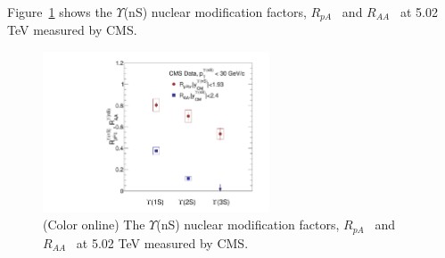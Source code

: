 Figure~\ref{fig:LHCpBPbPb} shows the $\Upsilon$(nS) nuclear modification factors,
    $R_{pA}$~\cite{CMS:2022wfi} and $R_{AA}$~\cite{CMS:2018zza}
    at 5.02 TeV measured by CMS.

\begin{figure}
\centering
  \includegraphics[width=0.60\textwidth]{Figures/ExpOverview/Fig_LHC_YnSRPPbRAAInt.pdf}
  \caption{(Color online) The $\Upsilon$(nS) nuclear modification factors,
    $R_{pA}$~\cite{CMS:2022wfi} and $R_{AA}$~\cite{CMS:2018zza}
    at 5.02 TeV measured by CMS.
  }
 \label{fig:LHCpBPbPb}
\end{figure}



  

